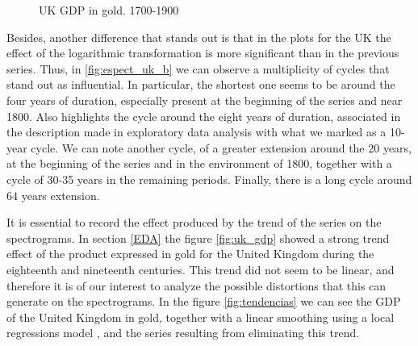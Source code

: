 \documentclass[a4paper]{article}
\begin{document}
	\begin{figure}[H]
		\centering
		\caption{UK GDP in gold. 1700-1900} \label{fig:espect_uk}
	\end{figure}
	
	Besides, another difference that stands out is that in the plots for the UK the effect of the logarithmic transformation is more significant than in the previous series. Thus, in \ref {fig:espect_uk_b} we can observe a multiplicity of cycles that stand out as influential. In particular, the shortest one seems to be around the four years of duration, especially present at the beginning of the series and near 1800. Also highlights the cycle around the eight years of duration, associated in the description made in exploratory data analysis with what we marked as a 10-year cycle. We can note another cycle, of a greater extension around the 20 years, at the beginning of the series and in the environment of 1800, together with a cycle of 30-35 years in the remaining periods. Finally, there is a long cycle around 64 years extension.
	
	It is essential to record the effect produced by the trend of the series on the spectrograms. In section \ref{EDA} the figure \ref{fig:uk_gdp} showed a strong trend effect of the product expressed in gold for the United Kingdom during the eighteenth and nineteenth centuries. This trend did not seem to be linear, and therefore it is of our interest to analyze the possible distortions that this can generate on the spectrograms. In the figure \ref{fig:tendencias} we can see the GDP of the United Kingdom in gold, together with a linear smoothing using a local regressions model \citep{Shyu1992}, and the series resulting from eliminating this trend.
	
\end{document}
